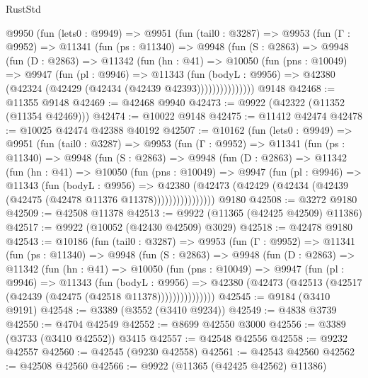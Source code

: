 \begin{lexlean}{RustStd}
\begin{coremodule}
    @9950
      (fun (lets0 : @9949) =>
      @9951
        (fun (tail0 : @3287) =>
        @9953
          (fun (Γ : @9952) =>
          @11341
            (fun (ps : @11340) =>
            @9948
              (fun (S : @2863) =>
              @9948
                (fun (D : @2863) =>
                @11342
                  (fun (hn : @41) =>
                  @10050
                    (fun (pns : @10049) =>
                    @9947
                      (fun (pl : @9946) =>
                      @11343
                        (fun (bodyL : @9956) =>
                        @42380 (@42324 (@42429 (@42434 (@42439 @42393)))))))))))))))
    @9148
@42468 := @11355 @9148
@42469 := @42468 @9940
@42473 := @9922 (@42322 (@11352 (@11354 @42469)))
@42474 := @10022 @9148
@42475 := @11412 @42474
@42478 := @10025 @42474 @42388 @40192
@42507 := @10162
    (fun (lets0 : @9949) =>
    @9951
      (fun (tail0 : @3287) =>
      @9953
        (fun (Γ : @9952) =>
        @11341
          (fun (ps : @11340) =>
          @9948
            (fun (S : @2863) =>
            @9948
              (fun (D : @2863) =>
              @11342
                (fun (hn : @41) =>
                @10050
                  (fun (pns : @10049) =>
                  @9947
                    (fun (pl : @9946) =>
                    @11343
                      (fun (bodyL : @9956) =>
                      @42380
                        (@42473
                          (@42429 (@42434 (@42439 (@42475 (@42478 @11376 @11378))))))))))))))))
    @9180
@42508 := @3272 @9180
@42509 := @42508 @11378
@42513 := @9922 (@11365 (@42425 @42509) @11386)
@42517 := @9922 (@10052 (@42430 @42509) @3029)
@42518 := @42478 @9180
@42543 := @10186
    (fun (tail0 : @3287) =>
    @9953
      (fun (Γ : @9952) =>
      @11341
        (fun (ps : @11340) =>
        @9948
          (fun (S : @2863) =>
          @9948
            (fun (D : @2863) =>
            @11342
              (fun (hn : @41) =>
              @10050
                (fun (pns : @10049) =>
                @9947
                  (fun (pl : @9946) =>
                  @11343
                    (fun (bodyL : @9956) =>
                    @42380 (@42473 (@42513 (@42517 (@42439 (@42475 (@42518 @11378)))))))))))))))
@42545 := @9184 (@3410 @9191)
@42548 := @3389 (@3552 (@3410 @9234))
@42549 := @4838 @3739
@42550 := @4704 @42549
@42552 := @8699 @42550 @3000
@42556 := @3389 (@3733 (@3410 @42552)) @3415
@42557 := @42548 @42556
@42558 := @9232 @42557
@42560 := @42545 (@9230 @42558)
@42561 := @42543 @42560
@42562 := @42508 @42560
@42566 := @9922 (@11365 (@42425 @42562) @11386)

\end{coremodule}
\end{lexlean}
